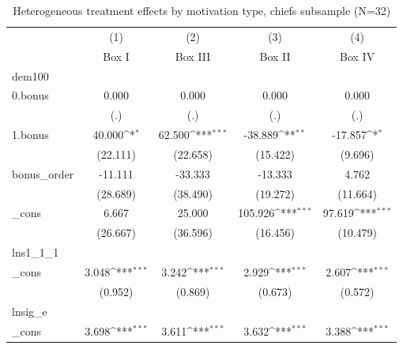 \begin{table}[htbp]\centering
\def\sym#1{\ifmmode^{#1}\else\(^{#1}\)\fi}
\caption{Heterogeneous treatment effects by motivation type, chiefs subsample (N=32)}
\begin{tabular}{l*{4}{c}}
\toprule
            &\multicolumn{1}{c}{(1)}&\multicolumn{1}{c}{(2)}&\multicolumn{1}{c}{(3)}&\multicolumn{1}{c}{(4)}\\
            &\multicolumn{1}{c}{Box I}&\multicolumn{1}{c}{Box III}&\multicolumn{1}{c}{Box II}&\multicolumn{1}{c}{Box IV}\\
\midrule
dem100      &                     &                     &                     &                     \\
0.bonus     &       0.000         &       0.000         &       0.000         &       0.000         \\
            &         (.)         &         (.)         &         (.)         &         (.)         \\
\addlinespace
1.bonus     &      40.000\sym{*}  &      62.500\sym{***}&     -38.889\sym{**} &     -17.857\sym{*}  \\
            &    (22.111)         &    (22.658)         &    (15.422)         &     (9.696)         \\
\addlinespace
bonus\_order &     -11.111         &     -33.333         &     -13.333         &       4.762         \\
            &    (28.689)         &    (38.490)         &    (19.272)         &    (11.664)         \\
\addlinespace
\_cons      &       6.667         &      25.000         &     105.926\sym{***}&      97.619\sym{***}\\
            &    (26.667)         &    (36.596)         &    (16.456)         &    (10.479)         \\
\midrule
lns1\_1\_1    &                     &                     &                     &                     \\
\_cons      &       3.048\sym{***}&       3.242\sym{***}&       2.929\sym{***}&       2.607\sym{***}\\
            &     (0.952)         &     (0.869)         &     (0.673)         &     (0.572)         \\
\midrule
lnsig\_e     &                     &                     &                     &                     \\
\_cons      &       3.698\sym{***}&       3.611\sym{***}&       3.632\sym{***}&       3.388\sym{***}\\

\end{tabular}
\end{table}
